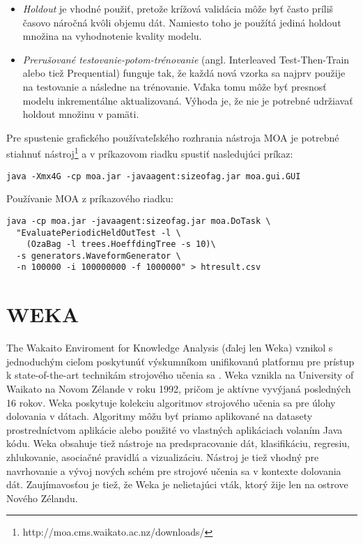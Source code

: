 \begin{itemize}
	\item \textit{Holdout} je vhodné použiť, pretože krížová validácia môže byť často príliš časovo náročná kvôli objemu dát. Namiesto toho je použítá jediná holdout množina na vyhodnotenie kvality modelu.
	\item \textit{Prerušované testovanie-potom-trénovanie} (angl. Interleaved Test-Then-Train alebo tiež Prequential) funguje tak, že každá nová vzorka sa najprv použije na testovanie a následne na trénovanie. Vďaka tomu môže byť presnosť modelu inkrementálne aktualizovaná. Výhoda je, že nie je potrebné udržiavať holdout množinu v pamäti. 
\end{itemize}
\par
Pre spustenie grafického používateľského rozhrania nástroja MOA je potrebné stiahnuť nástroj\footnote{http://moa.cms.waikato.ac.nz/downloads/} a v príkazovom riadku spustiť nasledujúci príkaz:
\begin{lstlisting}
java -Xmx4G -cp moa.jar -javaagent:sizeofag.jar moa.gui.GUI
\end{lstlisting}
Používanie MOA z príkazového riadku:
\begin{lstlisting}
java -cp moa.jar -javaagent:sizeofag.jar moa.DoTask \
  "EvaluatePeriodicHeldOutTest -l \
	(OzaBag -l trees.HoeffdingTree -s 10)\
  -s generators.WaveformGenerator \
  -n 100000 -i 100000000 -f 1000000" > htresult.csv
\end{lstlisting}


\section{WEKA}
The Wakaito Enviroment for Knowledge Analysis (ďalej len Weka) vznikol s jednoduchým cieľom poskytunúť výskumníkom unifikovanú platformu pre prístup k state-of-the-art technikám strojového učenia sa \citep{hall2009weka}. Weka vznikla na University of Waikato na Novom Zélande v roku 1992, pričom je aktívne vyvýjaná posledných 16 rokov. Weka poskytuje kolekciu algoritmov strojového učenia sa pre úlohy dolovania v dátach. Algoritmy môžu byť priamo aplikované na datasety prostredníctvom aplikácie alebo použité vo vlastných aplikáciach volaním Java kódu. Weka obsahuje tiež nástroje na predspracovanie dát, klasifikáciu, regresiu, zhlukovanie, asociačné pravidlá a vizualizáciu. Nástroj je tiež vhodný pre navrhovanie a vývoj nových schém pre strojové učenia sa v kontexte dolovania dát. Zaujímavosťou je tiež, že Weka je nelietajúci vták, ktorý žije len na ostrove Nového Zélandu. \\

